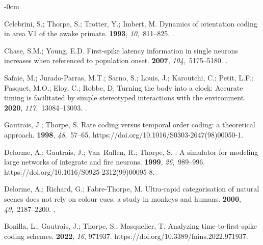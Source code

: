 \documentclass[brainsci, %
               review,accept,pdftex,moreauthors
               ]{Definitions/mdpi}
\begin{document}
\begin{adjustwidth}{-\extralength}{0cm}
\begin{thebibliography}{999}
Celebrini, S.; Thorpe, S.; Trotter, Y.; Imbert, M.
\newblock Dynamics of orientation coding in area {V1} of the awake primate.
 {\bf 1993}, {\em 10},~811--825.
.

Chase, S.M.; Young, E.D.
\newblock First-spike latency information in single neurons increases when
  referenced to population onset.
 {\bf 2007},
  {\em 104},~5175--5180.
.

Safaie, M.; Jurado-Parras, M.T.; Sarno, S.; Louis, J.; Karoutchi, C.; Petit,
  L.F.; Pasquet, M.O.; Eloy, C.; Robbe, D.
\newblock Turning the body into a clock: {Accurate} timing is facilitated by
  simple stereotyped interactions with the environment.
 {\bf 2020},
  {\em 117},~13084--13093.
.

Gautrais, J.; Thorpe, S.
\newblock Rate coding versus temporal order coding: a theoretical approach.
 {\bf 1998}, {\em 48},~57--65.
  {{https://doi.org/10.1016/S0303-2647(98)00050-1}}.

Delorme, A.; Gautrais, J.; Van~Rullen, R.; Thorpe, S.
: {A} simulator for modeling large networks of integrate
  and fire neurons.
 {\bf 1999}, {\em 26},~989--996.
  {{https://doi.org/10.1016/S0925-2312(99)00095-8}}.

Delorme, A.; Richard, G.; Fabre-Thorpe, M.
\newblock Ultra-rapid categorisation of natural scenes does not rely on colour
  cues: a study in monkeys and humans.
 {\bf 2000}, {\em 40},~2187--2200.
.

Bonilla, L.; Gautrais, J.; Thorpe, S.; Masquelier, T.
\newblock Analyzing time-to-first-spike coding schemes.
 {\bf 2022}, {\em 16}, 971937.
  {{https://doi.org/10.3389/fnins.2022.971937}}.


\end{thebibliography}
\end{adjustwidth}
\end{document}
